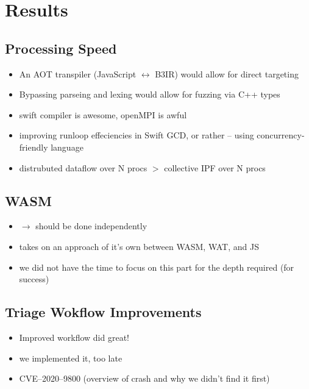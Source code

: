 \section{Results}
\subsection{Processing Speed}
\begin{itemize}
    \item An AOT transpiler (JavaScript $\leftrightarrow$ B3IR) would allow for direct targeting
    \item Bypassing parseing and lexing would allow for fuzzing via C++ types
    \item swift compiler is awesome, openMPI is awful
    \item improving runloop effeciencies in Swift GCD, or rather -- using concurrency-friendly language 
    \item distrubuted dataflow over N procs $>$ collective IPF over N procs 
\end{itemize}

\subsection{WASM}
\begin{itemize}
    \item $\rightarrow$ should be done independently
    \item takes on an approach of it's own between WASM, WAT, and JS
    \item we did not have the time to focus on this part for the depth required (for success)
\end{itemize}


\subsection{Triage Wokflow Improvements}
\begin{itemize}
    \item Improved workflow did great!
    \item we implemented it, too late
    \item CVE--2020--9800 (overview of crash and why we didn't find it first)
\end{itemize}



